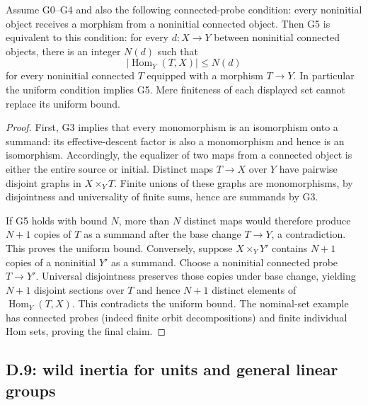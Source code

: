 \begin{proposition}
\label{D:G5-uniform-Hom}
Assume G0--G4 and also the following connected-probe condition:
every noninitial object receives a morphism from a noninitial connected
object. Then G5 is equivalent to this condition:
for every $d:X\to Y$ between noninitial connected objects, there is
an integer $N(d)$ such that
\[
 |\operatorname{Hom}_Y(T,X)|\leq N(d)
\]
for every noninitial connected $T$ equipped with a morphism $T\to Y$.
In particular the uniform condition implies G5. Mere finiteness of
each displayed set cannot replace its uniform bound.
\end{proposition}
\begin{proof}
First, G3 implies that every monomorphism is an isomorphism onto a
summand: its effective-descent factor is also a monomorphism and hence
is an isomorphism. Accordingly, the equalizer of two maps from a
connected object is either the entire source or initial. Distinct maps
$T\to X$ over $Y$ have pairwise disjoint graphs in $X\times_YT$.
Finite unions of these graphs are monomorphisms, by disjointness and
universality of finite sums, hence are summands by G3.

If G5 holds with bound $N$, more than $N$ distinct maps would therefore
produce $N+1$ copies of $T$ as a summand after the base change $T\to Y$,
a contradiction. This proves the uniform bound. Conversely, suppose
$X\times_YY'$ contains $N+1$ copies of a noninitial $Y'$ as a summand.
Choose a noninitial connected probe $T\to Y'$. Universal disjointness
preserves those copies under base change, yielding $N+1$ disjoint
sections over $T$ and hence $N+1$ distinct elements of
$\operatorname{Hom}_Y(T,X)$. This contradicts the uniform bound.
The nominal-set example has connected probes (indeed finite orbit
decompositions) and finite individual Hom sets, proving the final claim.
\end{proof}

\subsection{D.9: wild inertia for units and general linear groups}


